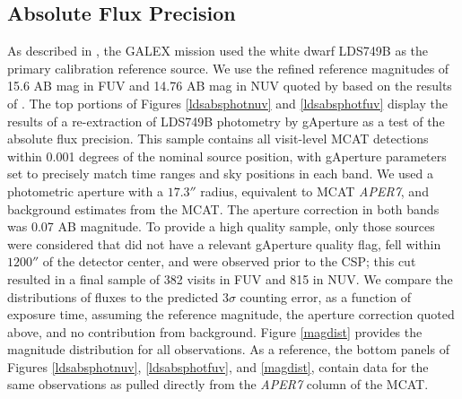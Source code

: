 \documentclass[preprint]{aastex}
\begin{document}
\subsection{Absolute Flux Precision}
As described in \citet{mor2007}, the GALEX mission used the white dwarf LDS749B as the primary calibration reference source. We use the refined reference magnitudes of 15.6 AB mag in FUV and 14.76 AB mag in NUV quoted by \cite{camarota2014white} based on the results of \cite{bohlin2008absolute}. The top portions of Figures \ref{ldsabsphotnuv} and \ref{ldsabsphotfuv} display the results of a re-extraction of LDS749B photometry by gAperture as a test of the absolute flux precision. This sample contains all visit-level MCAT detections within 0.001 degrees of the nominal source position, with gAperture parameters set to precisely match time ranges and sky positions in each band. We used a photometric aperture with a $17.3''$ radius, equivalent to MCAT \emph{APER7}, and background estimates from the MCAT. The aperture correction in both bands was 0.07 AB magnitude. To provide a high quality sample, only those sources were considered that did not have a relevant gAperture quality flag, fell within $1200''$ of the detector center, and were observed prior to the CSP; this cut resulted in a final sample of 382 visits in FUV and 815 in NUV. We compare the distributions of fluxes to the predicted 3$\sigma$ counting error, as a function of exposure time, assuming the reference magnitude, the aperture correction quoted above, and no contribution from background. Figure \ref{magdist} provides the magnitude distribution for all observations. As a reference, the bottom panels of Figures \ref{ldsabsphotnuv}, \ref{ldsabsphotfuv}, and \ref{magdist}, contain data for the same observations as pulled directly from the \emph{APER7} column of the MCAT.
\end{document}

